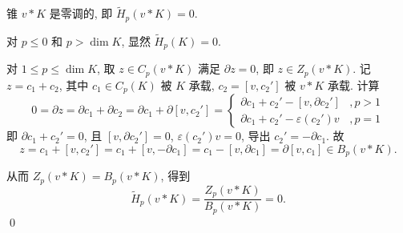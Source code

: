 	\begin{Theorem}
		锥 $ v*K $ 是零调的, 即 $ \tilde{H}_p(v*K)=0 $.
	\end{Theorem}
	\begin{Proof}
		对 $ p\leqslant 0 $ 和 $ p>\dim K $, 显然 $ \tilde{H}_p(K)=0 $.

		对 $ 1\leqslant p\leqslant\dim K $, 取 $ z\in C_p(v*K) $ 满足 $ \partial z=0 $, 即 $ z\in Z_p(v*K) $. 记 $ z=c_1+c_2 $, 其中 $ c_1\in C_p(K) $ 被 $ K $ 承载, $ c_2=[v,c_2'] $ 被 $ v*K $ 承载. 计算
		\[
			0=\partial z=\partial c_1+\partial c_2=\partial c_1+\partial[v,c_2']=\begin{cases}
				\partial c_1+c_2'-[v,\partial c_2'] & ,p>1\\
				\partial c_1+c_2'-\varepsilon(c_2')v & ,p=1
			\end{cases}
		\]
		即 $ \partial c_1+c_2'=0 $, 且 $ [v,\partial c_2']=0 $, $ \varepsilon(c_2')v=0 $, 导出 $ c_2'=-\partial c_1 $. 故
		\[
			z=c_1+[v,c_2']=c_1+[v,-\partial c_1]=c_1-[v,\partial c_1]=\partial[v,c_1]\in B_p(v*K).
		\]

		从而 $ Z_p(v*K)=B_p(v*K) $, 得到
		\[
			\tilde{H}_p(v*K)=\frac{Z_p(v*K)}{B_p(v*K)}=0.
		\]\qed
	\end{Proof}

